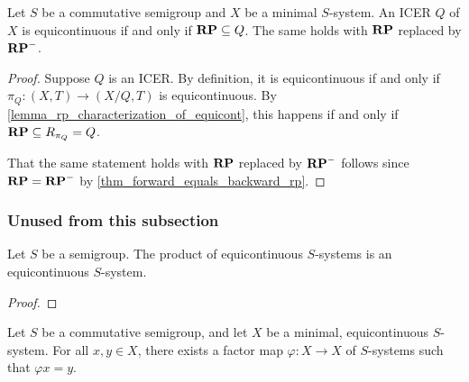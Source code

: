\begin{lemma}
    \label{lemma_rp_characterization_of_equicont_icer}
    \leanok{}
    Let $S$ be a commutative semigroup and $X$ be a minimal $S$-system.  An ICER $Q$ of $X$ is equicontinuous if and only if $\mathbf{RP} \subseteq Q$. The same holds with $\mathbf{RP}$ replaced by $\mathbf{RP}^-$.
\end{lemma}

\begin{proof}
    Suppose $Q$ is an ICER.  By definition, it is equicontinuous if and only if $\pi_Q: (X,T) \to (X/Q,T)$ is equicontinuous.  By \cref{lemma_rp_characterization_of_equicont}, this happens if and only if $\mathbf{RP} \subseteq R_{\pi_Q} = Q$.

    That the same statement holds with $\mathbf{RP}$ replaced by $\mathbf{RP}^-$ follows since $\mathbf{RP} = \mathbf{RP}^-$ by \cref{thm_forward_equals_backward_rp}.
\end{proof}

\subsubsection{Unused from this subsection}

\begin{lemma}
    \label{lemma_product_of_equi_is_equi}
    \leanok{}
    Let $S$ be a semigroup.  The product of equicontinuous $S$-systems is an equicontinuous $S$-system.
\end{lemma}

\begin{proof}
\leanok{}
    
\end{proof}

\begin{lemma}
    \label{lemma_minimal_equi_implies_homogeneous}
    Let $S$ be a commutative semigroup, and let $X$ be a minimal, equicontinuous $S$-system.  For all $x, y \in X$, there exists a factor map $\varphi: X \to X$ of $S$-systems such that $\varphi x = y$.
\end{lemma}

